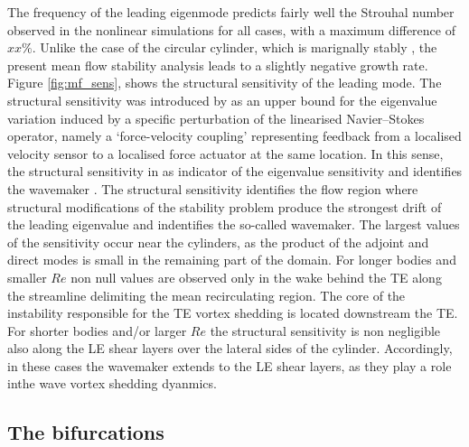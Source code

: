 The frequency of the leading eigenmode predicts fairly well the Strouhal number observed in the nonlinear simulations for all cases, with a maximum difference of $xx\%$. Unlike the case of the circular cylinder, which is marignally stably \citep{barkley-2006}, the present mean flow stability analysis leads to a slightly negative growth rate. Figure \ref{fig:mf_sens}, shows the structural sensitivity of the leading mode. The structural sensitivity was introduced by \cite{giannetti-luchini-2007} as an upper bound for the eigenvalue variation induced by a specific perturbation of the linearised Navier--Stokes operator, namely a `force-velocity coupling' representing feedback from a localised velocity sensor to a localised force actuator at the same location. In this sense, the structural sensitivity in as indicator of the eigenvalue sensitivity and identifies the wavemaker \citep{monkewitz-etal-1993}. The structural sensitivity identifies the flow region where structural modifications of the stability problem produce the strongest drift of the leading eigenvalue and indentifies the so-called wavemaker. The largest values of the sensitivity occur near the cylinders, as the product of the adjoint and direct modes is small in the remaining part of the domain. For longer bodies and smaller $Re$ non null values are observed only in the wake behind the TE along the streamline delimiting the mean recirculating region. The core of the instability responsible for the TE vortex shedding is located downstream the TE. For shorter bodies and/or larger $Re$ the structural sensitivity is non negligible also along the LE shear layers over the lateral sides of the cylinder. Accordingly, in these cases the wavemaker extends to the LE shear layers, as they play a role inthe wave vortex shedding dyanmics.

\subsection{The bifurcations}

